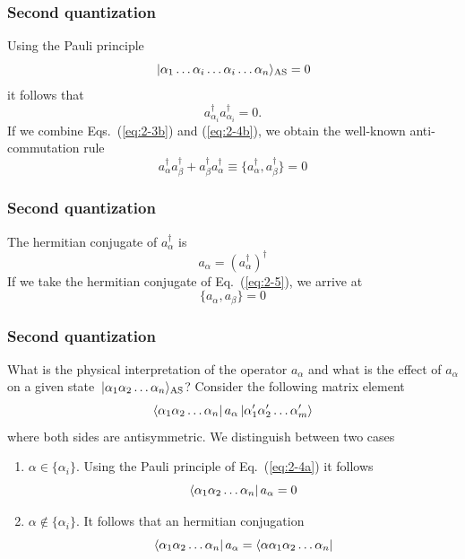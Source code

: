\frame
{
  \frametitle{Second quantization}
\begin{small}
{\scriptsize
Using the Pauli principle
\begin{equation}
	\ket{\alpha_1\dots \alpha_i\dots \alpha_i\dots \alpha_n}_{\mathrm{AS}} = 0 \label{eq:2-4a}
\end{equation}
it follows that
\begin{equation}
	a_{\alpha_i}^\dagger  a_{\alpha_i}^\dagger = 0. \label{eq:2-4b}
\end{equation}
If we combine Eqs.~(\ref{eq:2-3b}) and (\ref{eq:2-4b}), we obtain the well-known anti-commutation rule
\begin{equation}
	a_{\alpha}^\dagger  a_{\beta}^\dagger + a_{\beta}^\dagger  a_{\alpha}^\dagger \equiv 
		\{a_{\alpha}^\dagger,a_{\beta}^\dagger\} = 0 \label{eq:2-5}
\end{equation}
}
\end{small}
}

\frame
{
  \frametitle{Second quantization}
\begin{small}
{\scriptsize
The hermitian conjugate  of $a_\alpha^\dagger$ is
\begin{equation}
	a_{\alpha} = ( a_{\alpha}^\dagger )^\dagger \label{eq:2-6}
\end{equation}
If we take the hermitian conjugate of Eq.~(\ref{eq:2-5}), we arrive at 
\begin{equation}
	\{a_{\alpha},a_{\beta}\} = 0 \label{eq:2-7}
\end{equation}
}
\end{small}
}

\frame
{
  \frametitle{Second quantization}
\begin{small}
{\scriptsize
What is the physical interpretation of the operator $a_\alpha$ and what is the effect of 
$a_\alpha$ on a given state $\,|{\alpha_1\alpha_2\dots\alpha_n}\rangle_{\mathrm{AS}}$? 
Consider the following matrix element
\begin{equation}
	\element{\alpha_1\alpha_2 \dots \alpha_n}{a_\alpha}{\alpha_1'\alpha_2' \dots \alpha_m'} \label{eq:2-8}
\end{equation}
where both sides are antisymmetric. We  distinguish between two cases
\begin{enumerate}
\item $\alpha \in \{\alpha_i\}$. Using the Pauli principle of Eq.~(\ref{eq:2-4a}) it follows
	\begin{equation}
		\bra{\alpha_1\alpha_2 \dots \alpha_n}a_\alpha = 0 \label{eq:2-9a}
	\end{equation}
\item  $\alpha \notin \{\alpha_i\}$. It follows that an hermitian conjugation
	\begin{equation}
		\bra{\alpha_1\alpha_2 \dots \alpha_n}a_\alpha = \bra{\alpha\alpha_1\alpha_2 \dots \alpha_n}  \label{eq:2-9b}
	\end{equation}
\end{enumerate}
}
\end{small}
}

